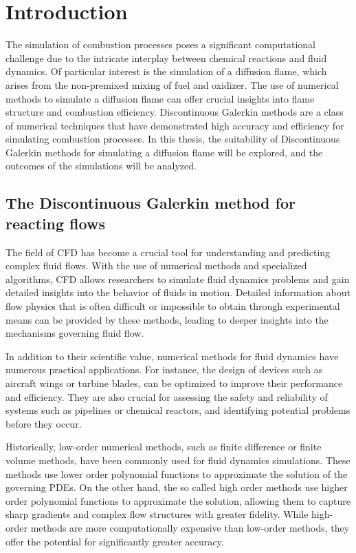 \chapter{Introduction}	\label{ch:introduction}
The simulation of combustion processes poses a significant computational challenge due to the intricate interplay between chemical reactions and fluid dynamics. Of particular interest is the simulation of a diffusion flame, which arises from the non-premixed mixing of fuel and oxidizer. The use of numerical methods to simulate a diffusion flame can offer crucial insights into flame structure and combustion efficiency. Discontinuous Galerkin methods are a class of numerical techniques that have demonstrated high accuracy and efficiency for simulating combustion processes. In this thesis, the suitability of Discontinuous Galerkin methods for simulating a diffusion flame will be explored, and the outcomes of the simulations will be analyzed.

\section{The Discontinuous Galerkin method for reacting flows}
The field of \Gls{CFD} has become a crucial tool for understanding and predicting complex fluid flows. With the use of numerical methods and specialized algorithms, CFD allows researchers to simulate fluid dynamics problems and gain detailed insights into the behavior of fluids in motion. Detailed information about flow physics that is often difficult or impossible to obtain through experimental means can be provided by these methods, leading to deeper insights into the mechanisms governing fluid flow. 

In addition to their scientific value, numerical methods for fluid dynamics have numerous practical applications. For instance, the design of devices such as aircraft wings or turbine blades, can be optimized to improve their performance and efficiency. They are also crucial for assessing the safety and reliability of systems such as pipelines or chemical reactors, and identifying potential problems before they occur.

Historically, low-order numerical methods, such as finite difference or finite volume methods, have been commonly used for fluid dynamics simulations. These methods use lower order polynomial functions to approximate the solution of the governing \glspl{PDE}. On the other hand, the so called high order methods use higher order polynomial functions to approximate the solution, allowing them to capture sharp gradients and complex flow structures with greater fidelity. While high-order methods are more computationally expensive than low-order methods, they offer the potential for significantly greater accuracy. 

